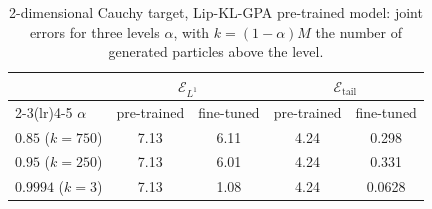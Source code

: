 \begin{table}[htbp]
\centering\small
\caption{2-dimensional Cauchy target, Lip-KL-GPA pre-trained model: joint errors for three levels $\alpha$, with $k=(1-\alpha)M$ the number of  generated particles above the level. }
\label{tab:alpha}
\begin{tabular}{lcccc}\toprule
 & \multicolumn{2}{c}{$\mathcal{E}_{L^1}$} & \multicolumn{2}{c}{$\mathcal{E}_{\mathrm{tail}}$}\\ \cmidrule(lr){2-3}\cmidrule(lr){4-5}
$\alpha$ & pre-trained & fine-tuned & pre-trained & fine-tuned\\ \midrule
$0.85$ ($k=750$) & 7.13 & {6.11} & 4.24 & {0.298}\\
$0.95$ ($k=250$) & 7.13 & {6.01} & 4.24 & {0.331}\\
$0.9994$ ($k=3$) & 7.13 & {1.08} & 4.24 & {0.0628}\\
\bottomrule\end{tabular}
\end{table}
